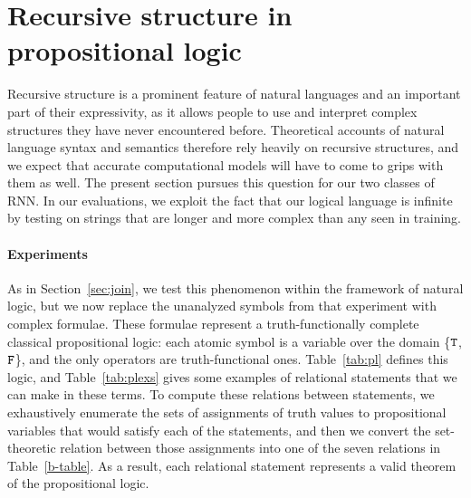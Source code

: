 \section{Recursive structure in propositional logic}\label{sec:recursion}

Recursive structure is a prominent feature of natural languages and an
important part of their expressivity, as it allows people to use and
interpret complex structures they have never encountered before.
Theoretical accounts of natural language syntax and semantics
therefore rely heavily on recursive structures, and we expect that
accurate computational models will have to come to grips with them as
well. The present section pursues this question for our two classes of
RNN. In our evaluations, we exploit the fact that our logical language
is infinite by testing on strings that are longer and more complex
than any seen in training.


\paragraph{Experiments}
As in Section~\ref{sec:join}, we test this phenomenon within the
framework of natural logic, but we now replace the unanalyzed symbols
from that experiment with complex formulae. These formulae
represent a truth-functionally complete classical propositional logic:
each atomic symbol is a variable over the domain \{$\texttt{T}$, $\texttt{F}$\}, and the only
operators are truth-functional ones.  Table~\ref{tab:pl} defines this
logic, and Table~\ref{tab:plexs} gives some examples of relational
statements that we can make in these terms. To compute these relations
between statements, we exhaustively enumerate the sets of assignments
of truth values to propositional variables that would satisfy each of
the statements, and then we convert the set-theoretic relation between
those assignments into one of the seven relations in
Table~\ref{b-table}. As a result, each relational statement represents
a valid theorem of the propositional logic.

